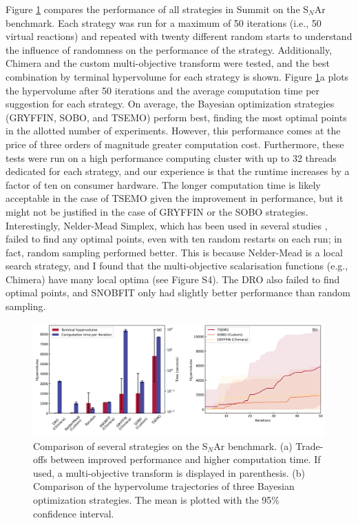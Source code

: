Figure \ref{fig:hv_time_tradeoff} compares the performance of all strategies in Summit on the S$_N$Ar benchmark. Each strategy was run for a maximum of 50 iterations (i.e., 50 virtual reactions) and repeated with twenty different random starts to understand the influence of randomness on the performance of the strategy. Additionally, Chimera and the custom multi-objective transform were tested, and the best combination by terminal hypervolume for each strategy is shown. Figure \ref{fig:hv_time_tradeoff}a plots the hypervolume after 50 iterations and the average computation time per suggestion for each strategy. On average, the Bayesian optimization strategies (GRYFFIN, SOBO, and TSEMO) perform best, finding the most optimal points in the allotted number of experiments. However, this performance comes at the price of three orders of magnitude greater computation cost. Furthermore, these tests were run on a high performance computing cluster with up to 32 threads dedicated for each strategy, and our experience is that the runtime increases by a factor of ten on consumer hardware.  The longer computation time is likely acceptable in the case of TSEMO given the improvement in performance, but it might not be justified in the case of GRYFFIN or the SOBO strategies.  Interestingly, Nelder-Mead Simplex, which has been used in several studies \cite{McMullen2010b, Parrott2011, Sans2015, CortesBorda2016, Fitzpatrick2016, McMullen2010a, Poscharny2018}, failed to find any optimal points, even with ten random restarts on each run; in fact, random sampling performed better. This is because Nelder-Mead is a local search strategy, and I found that the multi-objective scalarisation functions (e.g., Chimera) have many local optima (see Figure S4). The DRO also failed to find optimal points, and SNOBFIT only had slightly better performance than random sampling.

\begin{figure}
    \centering
    \includegraphics[width=1.2\textwidth]{gfx/Chapter03/snar_hv_time_tradeoff.png}
    \caption{Comparison of several strategies on the S$_N$Ar benchmark. (a) Trade-offs between improved performance and higher computation time. If used, a multi-objective transform is displayed in parenthesis. (b) Comparison of the hypervolume trajectories of three Bayesian optimization strategies. The mean is plotted with the 95\% confidence interval.}
    \label{fig:hv_time_tradeoff}
\end{figure}

